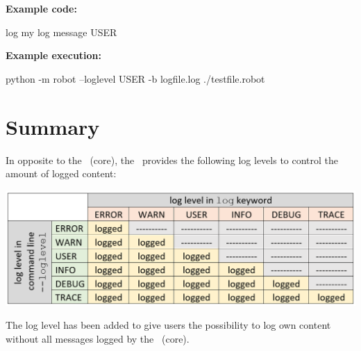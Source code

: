 \textbf{Example code:}

\begin{robotcode}
log    my log message    USER
\end{robotcode}

\textbf{Example execution:}

\begin{robotlog}
python -m robot --loglevel USER -b logfile.log ./testfile.robot
\end{robotlog}

\section{Summary}

In opposite to the \rfwcore\ (core), the \rfw\ provides the following log levels to control the amount of logged content:

\includegraphics[scale=0.7]{./include/graphics/logging/LogLevelTable}

The log level  has been added to give users the possibility to log own content without all  messages logged by the \rfwcore\ (core).

